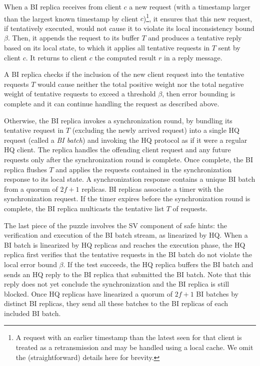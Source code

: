 \documentclass[twocolumn,10pt]{article}
\begin{document}
 When a BI replica receives from client $c$ a new request 
(with a timestamp
larger than the largest known timestamp by client $c$)\footnote{A
request with an earlier timestamp than the latest seen for that client
is treated as a retransmission and may be handled using a local
cache. We omit the (straightforward) details here for brevity.}, it
ensures that this new request, if tentatively executed, would
not cause it to violate its local inconsistency bound $\beta$.
 Then, it appends the request to its buffer $T$ and produces a
 tentative reply based on its local state, to which it applies all
 tentative requests in $T$ sent by client $c$.  It returns to client
 $c$ the computed result $r$ in a reply message.

 A BI replica checks if the inclusion of the new client request
into the tentative requests $T$ would cause neither the total
positive weight nor the total negative weight of tentative requests to
exceed a threshold $\beta$, then error bounding is complete and it
can continue handling the request as described above.

Otherwise, the BI replica invokes a synchronization
round, by bundling its tentative request in $T$ (excluding the newly
arrived request) into a single HQ request (called a \emph{BI batch}) and 
invoking the HQ protocol
as if it were a regular HQ client.  The replica handles the offending 
client request  and any future
requests only after the synchronization round is complete.
Once complete, the BI replica flushes
$T$ and applies the requests contained in the synchronization response to its local state.
A synchronization response contains a unique BI batch from a quorum of $2f+1$ replicas. BI
replicas associate a timer with the synchronization request. If the timer expires before
the synchronization round is complete, the BI replica multicasts the tentative list $T$ of
requests. 






 The last piece of the puzzle involves the SV
component of safe hints: the verification and execution of the BI batch
stream, as linearized by HQ.
When a BI batch
is linearized by HQ replicas and
reaches the execution phase, the HQ replica first verifies that the
tentative requests in
the BI batch
do not violate the local error bound $\beta$. If the test succeeds, the
HQ replica buffers the
BI batch and sends an HQ reply to the BI replica that submitted the BI batch. Note that
this reply does not yet conclude the synchronization and the BI replica
is still blocked.
Once HQ replicas have linearized a quorum of $2f+1$ BI batches by
distinct BI replicas, they send all
these batches to the BI replicas of each included BI batch.
\end{document}
